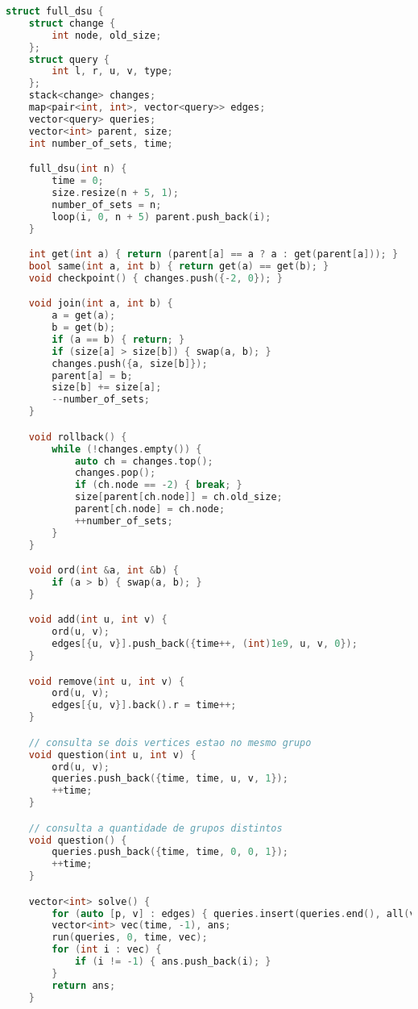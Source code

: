 \documentclass[11pt, a4paper, twoside]{article}
\begin{document}
\begin{lstlisting}[language=C++]
struct full_dsu {
    struct change {
        int node, old_size;
    };
    struct query {
        int l, r, u, v, type;
    };
    stack<change> changes;
    map<pair<int, int>, vector<query>> edges;
    vector<query> queries;
    vector<int> parent, size;
    int number_of_sets, time;

    full_dsu(int n) {
        time = 0;
        size.resize(n + 5, 1);
        number_of_sets = n;
        loop(i, 0, n + 5) parent.push_back(i);
    }

    int get(int a) { return (parent[a] == a ? a : get(parent[a])); }
    bool same(int a, int b) { return get(a) == get(b); }
    void checkpoint() { changes.push({-2, 0}); }

    void join(int a, int b) {
        a = get(a);
        b = get(b);
        if (a == b) { return; }
        if (size[a] > size[b]) { swap(a, b); }
        changes.push({a, size[b]});
        parent[a] = b;
        size[b] += size[a];
        --number_of_sets;
    }

    void rollback() {
        while (!changes.empty()) {
            auto ch = changes.top();
            changes.pop();
            if (ch.node == -2) { break; }
            size[parent[ch.node]] = ch.old_size;
            parent[ch.node] = ch.node;
            ++number_of_sets;
        }
    }

    void ord(int &a, int &b) {
        if (a > b) { swap(a, b); }
    }

    void add(int u, int v) {
        ord(u, v);
        edges[{u, v}].push_back({time++, (int)1e9, u, v, 0});
    }

    void remove(int u, int v) {
        ord(u, v);
        edges[{u, v}].back().r = time++;
    }

    // consulta se dois vertices estao no mesmo grupo
    void question(int u, int v) {
        ord(u, v);
        queries.push_back({time, time, u, v, 1});
        ++time;
    }

    // consulta a quantidade de grupos distintos
    void question() {
        queries.push_back({time, time, 0, 0, 1});
        ++time;
    }

    vector<int> solve() {
        for (auto [p, v] : edges) { queries.insert(queries.end(), all(v)); }
        vector<int> vec(time, -1), ans;
        run(queries, 0, time, vec);
        for (int i : vec) {
            if (i != -1) { ans.push_back(i); }
        }
        return ans;
    }


\end{lstlisting}
\end{document}
